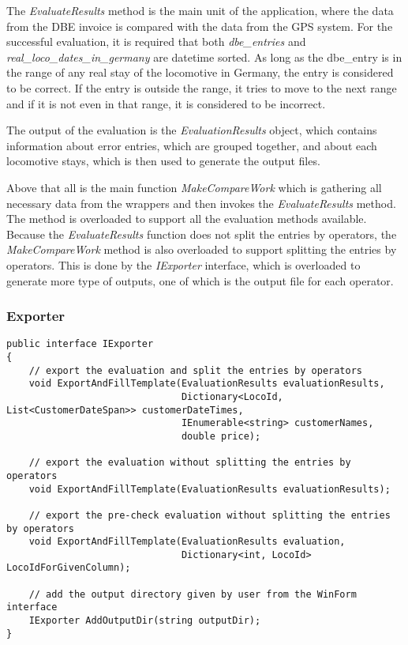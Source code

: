 \documentclass[11pt]{article}
\begin{document}
\pagebreak

The \textit{EvaluateResults} method is the main unit of the application, where the data from the DBE invoice is compared with the data from the GPS system. For the successful evaluation, it is required that both \textit{dbe\_entries} and \textit{real\_loco\_dates\_in\_germany} are datetime sorted. As long as the dbe\_entry is in the range of any real stay of the locomotive in Germany, the entry is considered to be correct. If the entry is outside the range, it tries to move to the next range and if it is not even in that range, it is considered to be incorrect.

The output of the evaluation is the \textit{EvaluationResults} object, which contains information about error entries, which are grouped together, and about each locomotive stays, which is then used to generate the output files.

Above that all is the main function \textit{MakeCompareWork} which is gathering all necessary data from the wrappers and then invokes the \textit{EvaluateResults} method. The method is overloaded to support all the evaluation methods available. Because the \textit{EvaluateResults} function does not split the entries by operators, the \textit{MakeCompareWork} method is also overloaded to support splitting the entries by operators. This is done by the \textit{IExporter} interface, which is overloaded to generate more type of outputs, one of which is the output file for each operator.

\subsubsection{Exporter}
\label{sec:Exporter}

\begin{verbatim}
public interface IExporter
{
    // export the evaluation and split the entries by operators
    void ExportAndFillTemplate(EvaluationResults evaluationResults,
                               Dictionary<LocoId, List<CustomerDateSpan>> customerDateTimes, 
                               IEnumerable<string> customerNames, 
                               double price);

    // export the evaluation without splitting the entries by operators
    void ExportAndFillTemplate(EvaluationResults evaluationResults);

    // export the pre-check evaluation without splitting the entries by operators
    void ExportAndFillTemplate(EvaluationResults evaluation, 
                               Dictionary<int, LocoId> LocoIdForGivenColumn);

    // add the output directory given by user from the WinForm interface
    IExporter AddOutputDir(string outputDir);
}
\end{verbatim}
\end{document}
